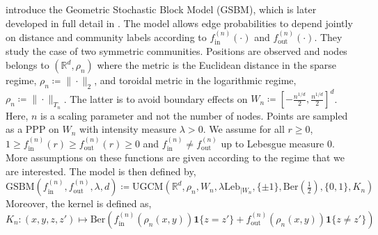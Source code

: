 \documentclass[runningheads]{llncs}
\begin{document}
\citep{sankararaman2018community} introduce the Geometric Stochastic Block Model (GSBM), which is later developed in full detail in \citep{abbe2021community}. The model allows edge probabilities to depend jointly on distance and community labels according to \(f_\mathrm{in}^{(n)}(\cdot)\) and \(f_\mathrm{out}^{(n)}(\cdot)\). They study the case of two symmetric communities. 
Positions are observed and nodes belongs to \((\mathbb R^d, \rho_n)\) 
where the metric is the Euclidean distance in the sparse regime, \(\rho_n \coloneqq \| \cdot \|_2 \), and toroidal metric in the logarithmic regime, \(\rho_n \coloneqq \| \cdot \|_{T_n}\). The latter is to avoid boundary effects on \(W_n \coloneqq \left[-\frac{n^{1/d}}{2}, \frac{n^{1/d}}{2}\right]^d\).
Here, \(n\) is a scaling parameter and not the number of nodes. Points are sampled as a PPP on \(W_n\) with intensity measure \(\lambda >0\). %
We assume for all \(r\geq 0\), \(1 \geq f_\mathrm{in}^{(n)}(r) \geq f_\mathrm{out}^{(n)}(r) \geq 0 \) and \(f_\mathrm{in}^{(n)} \neq f_\mathrm{out}^{(n)}\) up to Lebesgue measure \(0\). More assumptions on these functions are given according to the regime that we are interested. %
The model is then defined by,
\[
\mathrm{GSBM}(f_\mathrm{in}^{(n)}, f_\mathrm{out}^{(n)},\lambda,d) \coloneqq 
\mathrm{UGCM}(\mathbb R^d, \rho_n, W_n,  \lambda \mathrm{Leb}_{\mid W_n}, \{\pm1\}, \text{Ber}(\tfrac12), \{0,1\}, K_n)
\]
Moreover, the kernel is defined as,
\[
K_n: (x,y,z,z') \longmapsto \text{Ber}\left(f_\mathrm{in}^{(n)}(\rho_n(x,y))\mathbf{1}\{z=z'\} + f_\mathrm{out}^{(n)}(\rho_n(x,y))\mathbf{1}\{z\neq z'\}\right)
\]
\end{document}

